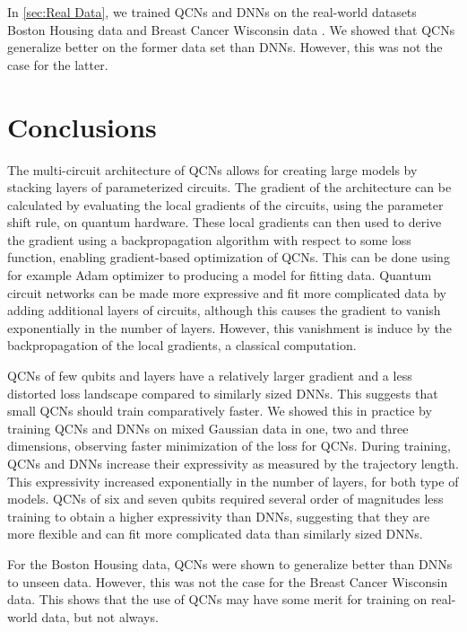 In \cref{sec:Real Data}, we trained QCNs and DNNs on the real-world datasets Boston Housing data \cite{boston} and Breast Cancer Wisconsin data \cite{cancer}. We showed that QCNs generalize better on the former data set than DNNs. However, this was not the case for the latter.  


\section{Conclusions}\label{sec:conclusion}
The multi-circuit architecture of QCNs allows for creating large models by stacking layers of parameterized circuits. The gradient of the architecture can be calculated by evaluating the local gradients of the circuits, using the parameter shift rule, on quantum hardware. These local gradients can then used to derive the gradient using a backpropagation algorithm with respect to some loss function, enabling gradient-based optimization of QCNs. This can be done using for example Adam optimizer to producing a model for fitting data. Quantum circuit networks can be made more expressive and fit more complicated data by adding additional layers of circuits, although this causes the gradient to vanish exponentially in the number of layers. However, this vanishment is induce by the backpropagation of the local gradients, a classical computation.  


QCNs of few qubits and layers have a relatively larger gradient and a less distorted loss landscape compared to similarly sized DNNs. This suggests that small QCNs should train comparatively faster. We showed this in practice by training QCNs and DNNs on mixed Gaussian data in one, two and three dimensions, observing faster minimization of the loss for QCNs. During training, QCNs and DNNs increase their expressivity as measured by the trajectory length. This expressivity increased exponentially in the number of layers, for both type of models. QCNs of six and seven qubits required several order of magnitudes less training to obtain a higher expressivity than DNNs, suggesting that they are more flexible and can fit more complicated data than similarly sized DNNs.

For the Boston Housing data, QCNs were shown to generalize better than DNNs to unseen data. However, this was not the case for the Breast Cancer Wisconsin data. This shows that the use of QCNs may have some merit for training on real-world data, but not always.

